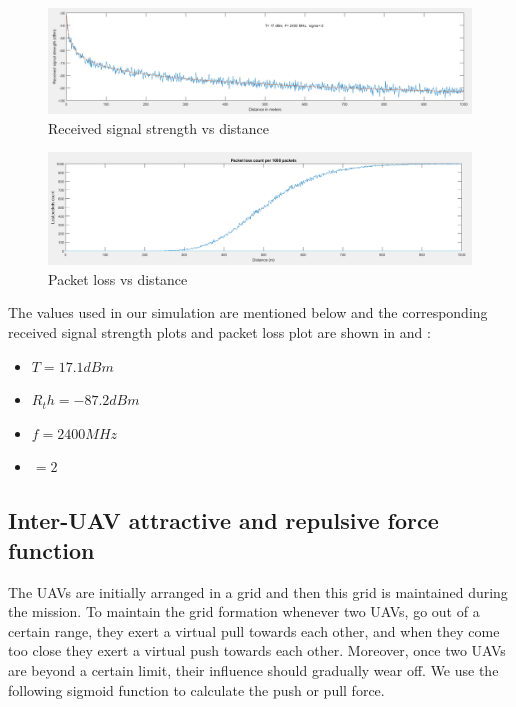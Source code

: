 \begin{figure}[hbtp]
\centering
\includegraphics[width=1\textwidth]{ncsuthesis-0.6/Chapter-4/figs/signal_strength}
\caption{Received signal strength vs distance}
\label{fig:signal_strength}
\end{figure}
\begin{figure}[hbtp]
\centering
\includegraphics[width=1\textwidth]{ncsuthesis-0.6/Chapter-4/figs/packet_loss}
\caption{Packet loss vs distance}
\label{fig:packet_loss}
\end{figure}
The values used in our simulation are mentioned below and the corresponding received signal strength plots and packet loss plot are shown in  and :
\begin{itemize}
    \item $T = 17.1  dBm $  
    \item $R_th = -87.2 dBm $
    \item $f = 2400 MHz $
    \item $ $\sigma$ = 2 $ 
\end{itemize}

\subsection{Inter-UAV attractive and repulsive force function}
The UAVs are initially arranged in a grid and then this grid is maintained during the mission. To maintain the grid formation whenever two UAVs, go out of a certain range, they exert a virtual pull towards each other, and when they come too close they exert a virtual push towards each other. Moreover, once two UAVs are beyond a certain limit, their influence should gradually wear off. We use the following sigmoid function to calculate the push or pull force. 

